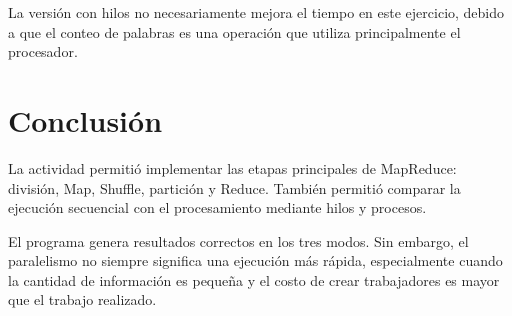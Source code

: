 La versión con hilos no necesariamente mejora el tiempo en este ejercicio,
debido a que el conteo de palabras es una operación que utiliza principalmente
el procesador.

\section{Conclusión}

La actividad permitió implementar las etapas principales de MapReduce:
división, Map, Shuffle, partición y Reduce. También permitió comparar la
ejecución secuencial con el procesamiento mediante hilos y procesos.

El programa genera resultados correctos en los tres modos. Sin embargo, el
paralelismo no siempre significa una ejecución más rápida, especialmente
cuando la cantidad de información es pequeña y el costo de crear trabajadores
es mayor que el trabajo realizado.